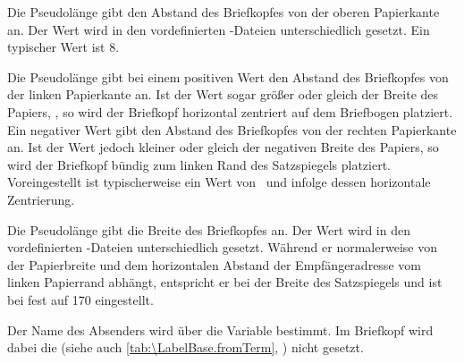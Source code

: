 \begin{Declaration}
\end{Declaration}
Die Pseudolänge  gibt den Abstand des Briefkopfes von
der oberen Papierkante an. Der Wert wird in den vordefinierten
-Dateien
unterschiedlich gesetzt. Ein typischer Wert ist 8.%
\EndIndexGroup


\begin{Declaration}
\end{Declaration}
Die Pseudolänge 
gibt bei einem positiven Wert den Abstand des Briefkopfes von der linken
Papierkante an. Ist der Wert sogar größer oder gleich der
Breite des Papiers,
, so
wird der Briefkopf horizontal zentriert auf dem Briefbogen platziert. Ein
negativer Wert gibt den Abstand des Briefkopfes von der rechten Papierkante
an. Ist der Wert jedoch kleiner oder gleich der negativen Breite des Papiers,
so wird der Briefkopf bündig zum linken Rand des Satzspiegels platziert.
Voreingestellt ist typischerweise ein Wert von
%
\iffalse %
, also der größtmögliche Wert für eine Länge%
\fi%
\ und infolge dessen horizontale Zentrierung.%
\EndIndexGroup


\begin{Declaration}
\end{Declaration}
Die Pseudolänge  gibt die Breite des Briefkopfes
an. Der Wert wird in den vordefinierten
-Dateien
unterschiedlich gesetzt. Während er normalerweise von
der Papierbreite und dem horizontalen Abstand der Empfängeradresse vom linken
Papierrand abhängt, entspricht er bei  der Breite des
Satzspiegels und ist bei  fest auf 170 eingestellt.%
\EndIndexGroup


\begin{Declaration}
\end{Declaration}
Der Name des Absenders wird über die Variable
 bestimmt. Im Briefkopf wird dabei die 
(siehe auch \autoref{tab:\LabelBase.fromTerm},
) nicht gesetzt.

